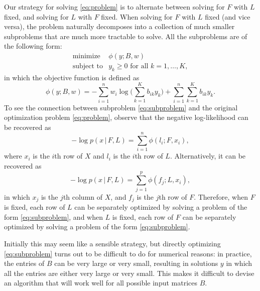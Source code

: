 \documentclass[final]{siamart171218}
\begin{document}
Our strategy for solving \eqref{eq:problem} is to alternate between
solving for $F$ with $L$ fixed, and solving for $L$ with $F$
fixed. When solving for $F$ with $L$ fixed (and vice versa), the
problem naturally decomposes into a collection of much smaller
subproblems that are much more tractable to solve. All the subproblems
are of the following form:
\begin{equation}
\begin{array}{ll}
\mbox{minimize} & \phi(y; B, w) \\
\mbox{subject to} & \mbox{$y_k \geq 0$ for all $k = 1, \ldots, K$},
\end{array}
\label{eq:subproblem}
\end{equation}
in which the objective function is defined as
\begin{equation}
\phi(y; B, w) =
    - \sum_{i=1}^n w_i \log\big({\textstyle \sum_{k=1}^K b_{ik} y_k}\big)
    + \sum_{i=1}^n \sum_{k=1}^K b_{ik} y_k.
\label{eq:subproblem-objective}
\end{equation}
To see the connection between subproblem \eqref{eq:subproblem} and the
original optimization problem \eqref{eq:problem}, observe that the
negative log-likelihood can be recovered as
\begin{equation}
-\log p(x \,|\, F, L) = \sum_{i=1}^n \phi(l_i; F, x_i),
\end{equation}
where $x_i$ is the $i$th row of $X$ and $l_i$ is the $i$th row of $L$.
Alternatively, it can be recovered as
\begin{equation}
-\log p(x \,|\, F, L) = \sum_{j=1}^p \phi(f_j; L, x_i),
\end{equation}
in which $x_j$ is the $j$th column of $X$, and $f_j$ is the $j$th row
of $F$. Therefore, when $F$ is fixed, each row of $L$ can be
separately optimized by solving a problem of the form
\eqref{eq:subproblem}, and when $L$ is fixed, each row of $F$ can be
separately optimized by solving a problem of the form
\eqref{eq:subproblem}.

Initially this may seem like a sensible strategy, but directly
optimizing \eqref{eq:subproblem} turns out to be difficult to do for
numerical reasons: in practice, the entries of $B$ can be very large
or very small, resulting in solutions $y$ in which all the entries are
either very large or very small. This makes it difficult to devise an
algorithm that will work well for all possible input matrices $B$.
\end{document}

